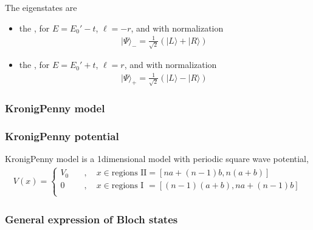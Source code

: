 \documentclass[letterpaper,10pt,english]{jupyterBook}
\begin{document}
\sphinxAtStartPar
The eigen\sphinxhyphen{}states are
\begin{itemize}
\item {} 
\sphinxAtStartPar
the , for \(E = E_0' - t\), \(\ell = -r\), and with normalization
\begin{equation*}
\begin{split}| \Psi \rangle_{-} = \frac{1}{\sqrt{2}} \left( | L \rangle + | R \rangle \right) \ \end{split}
\end{equation*}
\item {} 
\sphinxAtStartPar
the , for \(E = E_0' + t\), \(\ell = r\), and with normalization
\begin{equation*}
\begin{split}| \Psi \rangle_{+} = \frac{1}{\sqrt{2}} \left( | L \rangle - | R \rangle \right) \ \end{split}
\end{equation*}
\end{itemize}


\subsubsection{Kronig\sphinxhyphen{}Penny model}
\label{\detokenize{ch/solid-state/semiconductors-solids-qm:kronig-penny-model}}\label{\detokenize{ch/solid-state/semiconductors-solids-qm:semiconductors-solids-qm-energy-bands-kronig-penny}}\subsubsection*{Kronig\sphinxhyphen{}Penny potential}

\sphinxAtStartPar
Kronig\sphinxhyphen{}Penny model is a 1\sphinxhyphen{}dimensional model with periodic square wave potential,
\begin{equation*}
\begin{split}V(x) = \left\{\begin{aligned}
  V_0  \quad & , \quad x \in \text{regions II} = [ n a + (n-1) b, n ( a + b )]  \\
    0  \quad & , \quad x \in \text{regions I } = [ (n-1) (a+b), n a + (n-1) b] \\
\end{aligned}\right.\end{split}
\end{equation*}\subsubsection*{General expression of Bloch states}
\end{document}
